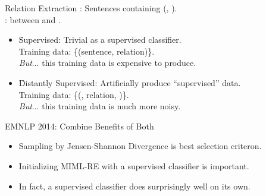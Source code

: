 \begin{frame}{Relation Extraction}
  :  Sentences containing (, ). \\
  :  between  and .
  \pause
  \vspace{1cm}

   \begin{itemize}
    \item \h{Supervised:} Trivial as a supervised classifier. \\
      Training data: \{(sentence, relation)\}. \\
      \textit{But}$\dots$ \pause this training data is expensive to produce.
    \pause
    \vspace{0.5cm}
  
    \item \h{Distantly Supervised:} Artificially produce ``supervised'' data. \\
      Training data: \{(, relation, )\}. \\
      \textit{But}$\dots$ \pause this training data is much more noisy.
  \end{itemize}
\end{frame}

\begin{frame}{EMNLP 2014: Combine Benefits of Both}
\begin{center}
\end{center}
\pause

\begin{itemize}
  \itemsep1em
  \item Sampling by Jensen-Shannon Divergence is best selection criteron.
  \pause
  \item Initializing MIML-RE with a supervised classifier is important.
  \pause
  \item In fact, a supervised classifier does surprisingly well on its own.
\end{itemize}

\end{frame}

